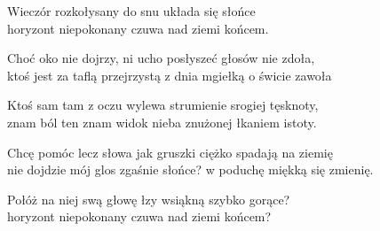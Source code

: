 \begin{text}
    Wieczór rozkołysany do snu układa się słońce\\
    horyzont niepokonany czuwa nad ziemi końcem.

    Choć oko nie dojrzy, ni ucho posłyszeć głosów nie zdoła,\\
    ktoś jest za taflą przejrzystą z dnia mgiełką o świcie zawoła

    Ktoś sam tam z oczu wylewa strumienie srogiej tęsknoty,\\
    znam ból ten znam widok nieba znużonej łkaniem istoty.

    Chcę pomóc lecz słowa jak gruszki ciężko spadają na ziemię\\
    nie dojdzie mój glos zgaśnie słońce? w poduchę miękką się zmienię.

    Połóż na niej swą głowę łzy wsiąkną szybko gorące?\\
    horyzont niepokonany czuwa nad ziemi końcem?
\end{text}
\begin{chord}

\end{chord}